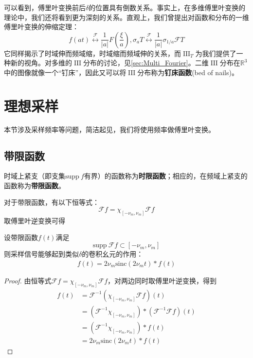 \documentclass{ctexbook}
\newcommand{\shah}{\operatorname{III}}
\begin{document}
可以看到，傅里叶变换前后$\delta$的位置具有倒数关系。事实上，在多维傅里叶变换的理论中，我们还将看到更为深刻的关系。直观上，我们曾提出对函数和分布的一维傅里叶变换的伸缩定理：
\[f(at)\overset{\mathcal{F} }{\longleftrightarrow}\frac{1}{|a|}F\left(\frac{\xi}{a}\right),\sigma_a T\overset{\mathcal{F} }{\longleftrightarrow}\frac{1}{|a|}\sigma_{1/a}\mathcal{F} T\]
它同样揭示了时域伸而频域缩，时域缩而频域伸的关系，而$\shah_T$为我们提供了一种新的视角。对多维的$\shah$分布的讨论，见\ref{sec:Multi_Fourier}。二维$\shah$分布在$\mathbb{R}^3$中的图像就像一个“钉床”，因此又可以将$\shah$分布称为\textbf{钉床函数}(bed of nails)。

\section{理想采样}\label{sec:Ideal_Sample}

本节涉及采样频率等问题，简洁起见，我们将使用频率做傅里叶变换。

\subsection{带限函数}\label{sub:band_limit}

\begin{definition}[时限函数与带限函数]
    时域上紧支（即支集$\text{supp}\ f$有界）的函数称为\textbf{时限函数}；相应的，在频域上紧支的函数称为\textbf{带限函数}。
\end{definition}

对于带限函数，有以下恒等式：
\[\mathcal{F} f=\chi_{[-\nu_m,\nu_m]}\mathcal{F} f\]
取傅里叶逆变换可得
\begin{theorem}
    设带限函数$f(t)$满足$$\text{supp}\ \mathcal{F} f\subset [-\nu_m,\nu_m]$$
    则采样信号能够起到类似$\delta$的卷积幺元的作用：\begin{align*}
        f(t)=2\nu_m\text{sinc}(2\nu_m t)*f(t)
    \end{align*}
\end{theorem}
\begin{proof}
    由恒等式$\mathcal{F} f=\chi_{[-\nu_m,\nu_m]}\mathcal{F} f$，对两边同时取傅里叶逆变换，得到
    \begin{align*}
        f(t)&=\mathcal{F} ^{-1}(\chi_{[-\nu_m,\nu_m]}\mathcal{F} f)(t)\\
               &=\left(\mathcal{F} ^{-1}\chi_{[-\nu_m,\nu_m]}\right)*\left(\mathcal{F} ^{-1}\mathcal{F} f\right)(t)\\
               &=\left(\mathcal{F} ^{-1}\chi_{[-\nu_m,\nu_m]}\right)*f(t)\\
               &=2\nu_m\text{sinc}(2\nu_m t)*f(t)
    \end{align*}
\end{proof}
\end{document}
